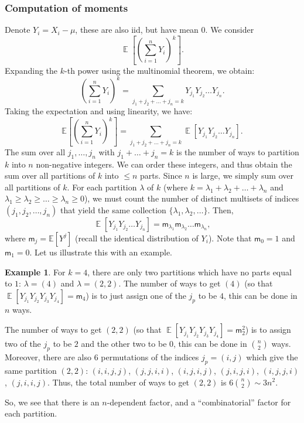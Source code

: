 \documentclass[letterpaper,11pt,oneside,reqno]{article}
\numberwithin{equation}{section}
\theoremstyle{definition}
\newtheorem{example}[proposition]{Example}
\begin{document}
\subsubsection{Computation of moments}

Denote $Y_i=X_i-\mu$, these are also iid, but have mean $0$.
We consider
\begin{equation*}
	\operatorname{\mathbb{E}}\left[ \left( \sum_{i=1}^n Y_i \right)^k \right].
\end{equation*}
Expanding the $k$-th power using the multinomial theorem, we obtain:
\begin{equation*}
\left( \sum_{i=1}^n Y_i \right)^k = \sum_{j_1 + j_2 + \dots + j_n = k}
Y_{j_1} Y_{j_2} \dots Y_{j_n}.
\end{equation*}
Taking the expectation and using linearity, we have:
\begin{equation*}
 \mathbb{E}\left[ \left( \sum_{i=1}^n Y_i \right)^k \right]
 =
 \sum_{j_1 + j_2 + \dots + j_n = k}
 \operatorname{\mathbb{E}}\left[
	 Y_{j_1} Y_{j_2} \dots Y_{j_n}
 \right].
\end{equation*}
The sum over all $j_1, \ldots, j_n$ with $j_1 + \ldots + j_n = k$ is the number of ways to partition $k$ into $n$ non-negative integers.
We can order these integers, and thus
obtain the sum over all partitions of $k$ into $\le n$ parts.
Since $n$ is large, we simply sum over all partitions of $k$.
For each partition $\lambda$ of $k$
(where $k=\lambda_1+\lambda_2+\ldots+\lambda_n $ and
$\lambda_1\geq \lambda_2\geq \ldots\geq \lambda_n\geq 0$),
we must count the number of distinct multisets of indices
\((j_1,j_2,\ldots,j_n)\) that yield the same collection
\(\{\lambda_1,\lambda_2,\ldots\}\).
Then,
\begin{equation*}
	\operatorname{\mathbb{E}}\left[
		Y_{j_1} Y_{j_2} \dots Y_{j_n}
	\right]=
	\mathsf{m}_{\lambda_1}\mathsf{m}_{\lambda_2}\ldots \mathsf{m}_{\lambda_n},
\end{equation*}
where $\mathsf{m}_j=\mathbb{E}[Y^j]$ (recall the identical distribution of $Y_i$).
Note that
$\mathsf{m}_0 = 1$ and
$\mathsf{m}_1 = 0$.
Let us illustrate this with an
example.

\begin{example}
	For $k=4$, there are only two partitions
	which have no parts equal to $1$:
	$\lambda=(4)$ and $\lambda=(2,2)$.
	The number of ways to get $(4)$
	(so that
	$\operatorname{\mathbb{E}}[Y_{j_1} Y_{j_2} Y_{j_3} Y_{j_4}] = \mathsf{m}_4$)
	is to just
	assign one of the $j_p$ to be $4$,
	this can be done in $n$ ways.

	The number of ways to get $(2,2)$
	(so that
	$\operatorname{\mathbb{E}}[Y_{j_1} Y_{j_2} Y_{j_3} Y_{j_4}] = \mathsf{m}_2^2$)
	is to assign
	two of the $j_p$ to be $2$ and the other two to be $0$, this can be done in $\binom{n}{2}$ ways. Moreover,
	there are also 6 permutations of the indices
	$j_p=(i,j)$ which give the same partition $(2,2)$:
	$(i,i,j,j)$, $(j,j,i,i)$, $(i,j,i,j)$, $(j,i,j,i)$, $(i,j,j,i)$, $(j,i,i,j)$.
	Thus, the total number of ways to get $(2,2)$ is $6\binom{n}{2}\sim 3n^2$.

	So, we see that there is an $n$-dependent factor,
	and a ``combinatorial'' factor for each partition.
\end{example}
\end{document}
